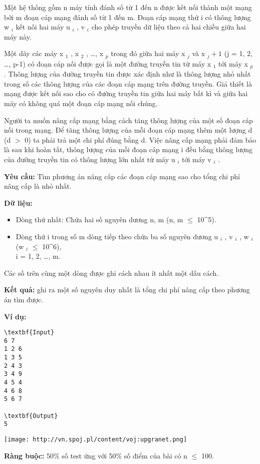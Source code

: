 

Một hệ thống gồm n máy tính đánh số từ 1 đến n được kết nối thành một mạng bởi m đoạn cáp mạng đánh số từ 1 đến m. Đoạn cáp mạng thứ i có thông lượng w $_ i $ kết nối hai máy u $_ i $ , v $_ i $ cho phép truyền dữ liệu theo cả hai chiều giữa hai máy này.

Một dãy các máy x $_ 1 $ , x $_ 2 $ , …, x $_ p $ trong đó giữa hai máy x $_ j $ và x $_ j+1 $ (j = 1, 2, …, p-1) có đoạn cáp nối được gọi là một đường truyền tin từ máy x $_ 1 $ tới máy x $_ p $ . Thông lượng của đường truyền tin được xác định như là thông lượng nhỏ nhất trong số các thông lượng của các đoạn cáp mạng trên đường truyền. Giả thiết là mạng được kết nối sao cho có đường truyền tin giữa hai máy bất kì và giữa hai máy có không quá một đoạn cáp mạng nối chúng.

Người ta muốn nâng cấp mạng bằng cách tăng thông lượng của một số đoạn cáp nối trong mạng. Để tăng thông lượng của mỗi đoạn cáp mạng thêm một lượng d (d $>$ 0) ta phải trả một chi phí đúng bằng d. Việc nâng cấp mạng phải đảm bảo là sau khi hoàn tất, thông lượng của mỗi đoạn cáp mạng i đều bằng thông lượng của đường truyền tin có thông lượng lớn nhất từ máy u $_ i $ tới máy v $_ i $ .

\textbf{Yêu cầu: } Tìm phương án nâng cấp các đoạn cáp mạng sao cho tổng chi phí nâng cấp là nhỏ nhất.

\textbf{Dữ liệu: }
\begin{itemize}
	\item Dòng thứ nhất: Chứa hai số nguyên dương n, m (n, m  $\le$  10\textasciicircum5).
\end{itemize}
\begin{itemize}
	\item Dòng thứ i trong số m dòng tiếp theo chứa ba số nguyên dương u $_ i $ , v $_ i $ , w $_ i $ (w $_ i $  $\le$  10\textasciicircum6),
\\i = 1, 2, …, m.
\end{itemize}

Các số trên cùng một dòng được ghi cách nhau ít nhất một dấu cách.

\textbf{Kết quả: } ghi ra một số nguyên duy nhất là tổng chi phí nâng cấp theo phương án tìm được.

\textbf{Ví dụ: }\textbf{}
\begin{verbatim}
\textbf{Input}
6 7
1 2 6
1 3 5
2 4 3
3 4 9
4 5 4
4 6 8
5 6 7

\textbf{Output}
5\end{verbatim}


\texttt{[image: http://vn.spoj.pl/content/voj:upgranet.png]}

\textbf{Ràng buộc: } 50\% số test ứng với 50\% số điểm của bài có n  $\le$  100.
